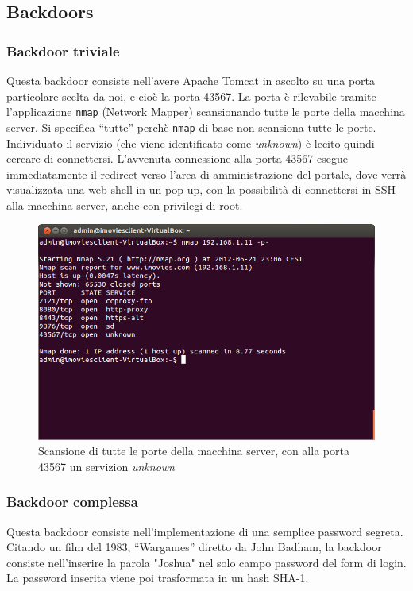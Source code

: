 \documentclass{article}
\begin{document}
\subsection{Backdoors}

\subsubsection{Backdoor triviale}
Questa backdoor consiste nell'avere Apache Tomcat in ascolto su una porta particolare scelta da noi, e cioè la porta 43567.
La porta è rilevabile tramite l'applicazione {\tt nmap} (Network Mapper) scansionando tutte le porte della macchina server. Si specifica ``tutte'' perchè {\tt nmap} di base non scansiona tutte le porte. Individuato il servizio (che viene identificato come \emph{unknown}) è lecito quindi cercare di connettersi. L'avvenuta connessione alla porta 43567 esegue immediatamente il redirect verso l'area di amministrazione del portale, dove verrà visualizzata una web shell in un pop-up, con la possibilità di connettersi in SSH alla macchina server, anche con privilegi di root.
\begin{figure}[h!]
\centering
\centerline{\includegraphics[scale=0.4,keepaspectratio]{img/nmap_scan.png}}
\caption{Scansione di tutte le porte della macchina server, con alla porta 43567 un servizion \emph{unknown}}
\end{figure}

\subsubsection{Backdoor complessa}
Questa backdoor consiste nell'implementazione di una semplice password segreta. Citando un film del 1983, ``Wargames'' diretto da John Badham, la backdoor consiste nell'inserire la parola "Joshua" nel solo campo password del form di login. La password inserita viene poi trasformata in un hash SHA-1.
\end{document}
